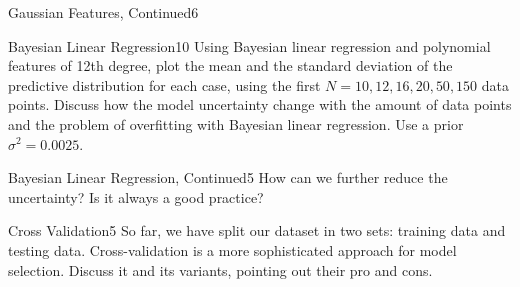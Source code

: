 \begin{questions}
\begin{question}{Gaussian Features, Continued}{6}
\begin{answer}\end{answer}

\end{question}


\begin{question}{Bayesian Linear Regression}{10}
Using Bayesian linear regression and polynomial features of 12th degree, plot the mean and the standard deviation of the predictive distribution for each case, using the first $N={10, 12, 16, 20, 50, 150}$ data points.
Discuss how the model uncertainty change with the amount of data points and the problem of overfitting with Bayesian linear regression. Use a prior $\sigma^2=0.0025$.

\begin{answer}\end{answer}
\end{question}


\begin{question}{Bayesian Linear Regression, Continued}{5}
How can we further reduce the uncertainty? Is it always a good practice?

\begin{answer}\end{answer}
\end{question}


\begin{question}[bonus]{Cross Validation}{5}
So far, we have split our dataset in two sets: training data and testing data. Cross-validation is a more sophisticated approach for model selection. Discuss it and its variants, pointing out their pro and cons.
\end{question}

\begin{answer}\end{answer}

\end{questions}
